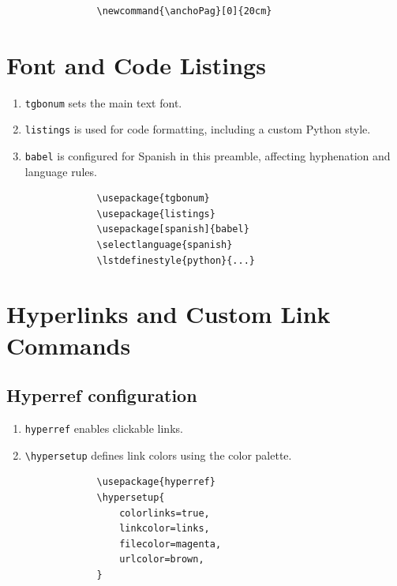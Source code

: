 \begin{minipage}{\anchoPag}
		\begin{mdframed}[style=code]
			\begin{verbatim}
				\newcommand{\anchoPag}[0]{20cm}
			\end{verbatim}
		\end{mdframed}
		
		\section{Font and Code Listings}\label{sec:font}
		
		\begin{enumerate}
			\item \texttt{tgbonum} sets the main text font.
			\item \texttt{listings} is used for code formatting, including a custom Python style.
			\item \texttt{babel} is configured for Spanish in this preamble, affecting hyphenation and language rules.
		\end{enumerate}
		
		\begin{mdframed}[style=code]
			\begin{verbatim}
				\usepackage{tgbonum}
				\usepackage{listings}
				\usepackage[spanish]{babel}
				\selectlanguage{spanish}
				\lstdefinestyle{python}{...}
			\end{verbatim}
		\end{mdframed}
		
		\section{Hyperlinks and Custom Link Commands}\label{sec:links}
		
		\subsection{Hyperref configuration}
		
		\begin{enumerate}
			\item \texttt{hyperref} enables clickable links.
			\item \texttt{\textbackslash hypersetup} defines link colors using the color palette.
		\end{enumerate}
		
		\begin{mdframed}[style=code]
			\begin{verbatim}
				\usepackage{hyperref}
				\hypersetup{
					colorlinks=true,
					linkcolor=links,
					filecolor=magenta,
					urlcolor=brown,
				}
			\end{verbatim}
		\end{mdframed}
		

\end{minipage}
